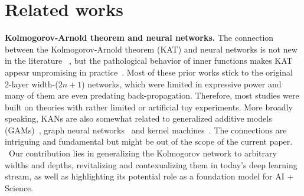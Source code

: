 \documentclass{article}
\numberwithin{equation}{section}
\numberwithin{figure}{section}
\begin{document}
\section{Related works}\label{sec:related_works}

{\bf Kolmogorov-Arnold theorem and neural networks.} The connection between the Kolmogorov-Arnold theorem (KAT) and neural networks is not new in the literature ~\cite{poggio2022deep,schmidt2021kolmogorov,sprecher2002space,koppen2002training,lin1993realization,lai2021kolmogorov,leni2013kolmogorov,fakhoury2022exsplinet,ismayilova2024kolmogorov,poluektov2023new}, but the pathological behavior of inner functions makes KAT appear unpromising in practice~\cite{poggio2022deep}. Most of these prior works stick to the original 2-layer width-($2n+1$) networks, which were limited in expressive power and many of them are even predating back-propagation. Therefore, most studies were built on theories with rather limited or artificial toy experiments. More broadly speaking, KANs are also somewhat related to generalized additive models (GAMs)~\cite{agarwal2021neural}, graph neural networks~\cite{zaheer2017deep} and kernel machines~\cite{song2018optimizing}. The connections are intriguing and fundamental but might be out of the scope of the current paper.%
~Our contribution lies in generalizing the Kolmogorov network to arbitrary widths and depths, revitalizing and contexualizing them in today's deep learning stream, as well as highlighting its potential role as a foundation model for AI + Science. %
\end{document}
